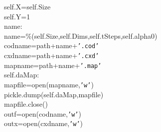 {{\begin{tabbing}
\hspace{72pt}self.X\hspace{6pt}=\hspace{6pt}self.Size\\
\hspace{72pt}self.Y\hspace{6pt}=\hspace{6pt}1\\
\hspace{6pt}name:\\
\hspace{72pt}name\hspace{6pt}=\%(self.Size,self.Dims,self.tSteps,self.alpha0)\\
\hspace{48pt}codname\hspace{6pt}=\hspace{6pt}path+name+{\texttt{{'}.cod{'}}}\\
\hspace{48pt}cxdname\hspace{6pt}=\hspace{6pt}path+name+{\texttt{{'}.cxd{'}}}\\
\hspace{48pt}mapname\hspace{6pt}=\hspace{6pt}path+name+{\texttt{{'}.map{'}}}\\
\hspace{6pt}self.daMap:\\
\hspace{72pt}mapfile\hspace{6pt}=\hspace{6pt}open(mapname,{\texttt{{'}w{'}}})\\
\hspace{72pt}pickle.dump(self.daMap,mapfile)\\
\hspace{72pt}mapfile.close()\\
\hspace{48pt}outf\hspace{6pt}=\hspace{6pt}open(codname,{\texttt{{'}w{'}}})\\
\hspace{48pt}outx\hspace{6pt}=\hspace{6pt}open(cxdname,{\texttt{{'}w{'}}})\\

\end{tabbing}}}
